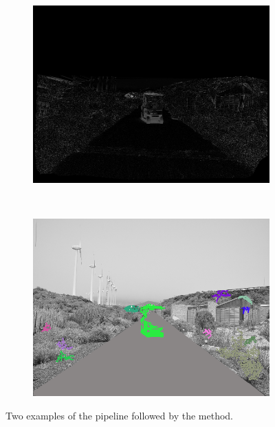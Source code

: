 \begin{figure}[t]
\begin{subfigure}[b]{0.24\columnwidth}
	    \includegraphics[width=\textwidth]{pipeline2/fig4}\label{fig:pipelineB_3}
        \end{subfigure}%
        ~
        \begin{subfigure}[b]{0.24\columnwidth}
	    \includegraphics[width=\textwidth]{pipeline2/fig5}\label{fig:pipelineB_4}
        \end{subfigure}%
        \caption{Two examples of the pipeline followed by the method.}\label{fig:cp01_pipeline_example}
\end{figure}

